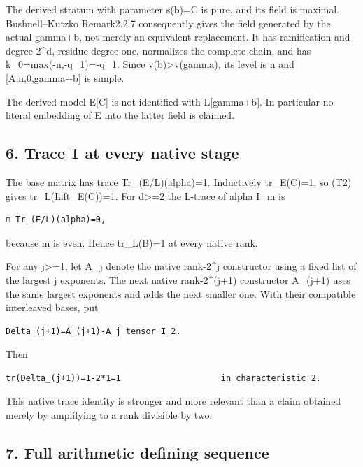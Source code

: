 The derived stratum with parameter s(b)=C is pure, and its field is
maximal. Bushnell--Kutzko Remark2.2.7 consequently gives the field
generated by the actual gamma+b, not merely an equivalent replacement.
It has ramification and degree 2\^{}d, residue degree one, normalizes
the complete chain, and has k\_0=max(-n,-q\_1)=-q\_1. Since
v(b)\textgreater v(gamma), its level is n and {[}A,n,0,gamma+b{]} is
simple.

The derived model E{[}C{]} is not identified with L{[}gamma+b{]}. In
particular no literal embedding of E into the latter field is claimed.

\hypertarget{dyadic_tower-trace-1-at-every-native-stage}{%
\subsection{6. Trace 1 at every native
stage}\label{dyadic_tower-trace-1-at-every-native-stage}}

The base matrix has trace Tr\_(E/L)(alpha)=1. Inductively tr\_E(C)=1, so
(T2) gives tr\_L(Lift\_E(C))=1. For d\textgreater=2 the L-trace of alpha
I\_m is

\begin{Verbatim}[fontsize=\small,breaklines=true,breakanywhere=true]
m Tr_(E/L)(alpha)=0,
\end{Verbatim}

because m is even. Hence tr\_L(B)=1 at every native rank.

For any j\textgreater=1, let A\_j denote the native rank-2\^{}j
constructor using a fixed list of the largest j exponents. The next
native rank-2\^{}(j+1) constructor A\_(j+1) uses the same largest
exponents and adds the next smaller one. With their compatible
interleaved bases, put

\begin{Verbatim}[fontsize=\small,breaklines=true,breakanywhere=true]
Delta_(j+1)=A_(j+1)-A_j tensor I_2.
\end{Verbatim}

Then

\begin{Verbatim}[fontsize=\small,breaklines=true,breakanywhere=true]
tr(Delta_(j+1))=1-2*1=1                    in characteristic 2.
\end{Verbatim}

This native trace identity is stronger and more relevant than a claim
obtained merely by amplifying to a rank divisible by two.

\hypertarget{dyadic_tower-full-arithmetic-defining-sequence}{%
\subsection{7. Full arithmetic defining
sequence}\label{dyadic_tower-full-arithmetic-defining-sequence}}

